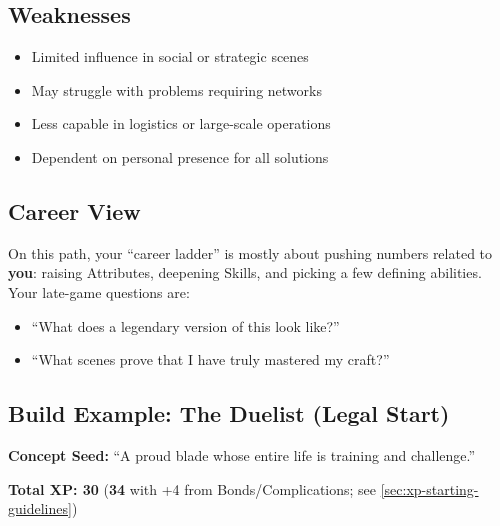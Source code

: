 \subsection*{Weaknesses}
\begin{itemize}
\item Limited influence in social or strategic scenes
\item May struggle with problems requiring networks
\item Less capable in logistics or large-scale operations
\item Dependent on personal presence for all solutions
\end{itemize}

\subsection*{Career View}

On this path, your ``career ladder'' is mostly about pushing numbers related to
\textbf{you}: raising Attributes, deepening Skills, and picking a few defining
abilities. Your late-game questions are:
\begin{itemize}
  \item ``What does a legendary version of this look like?''
  \item ``What scenes prove that I have truly mastered my craft?''
\end{itemize}

\subsection*{Build Example: The Duelist (Legal Start)}

\textbf{Concept Seed:} ``A proud blade whose entire life is training and challenge.''

\medskip

\noindent\textbf{Total XP: 30} \quad (\textbf{34} with +4 from Bonds/Complications; see \ref{sec:xp-starting-guidelines})

